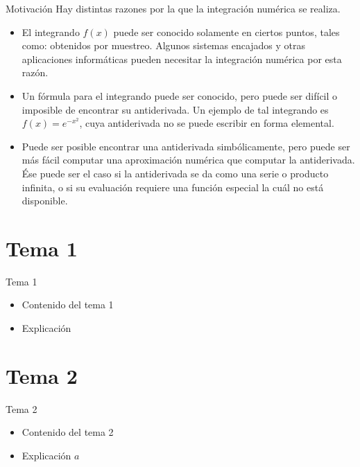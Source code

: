 \documentclass[12pt]{beamer}
\begin{document}
\begin{frame}{Motivaci\'on}
    Hay distintas razones por la que la integraci\'on num\'erica se realiza.
    \begin{itemize}
    \item<2-> El integrando $f(x)$ puede ser conocido solamente en ciertos puntos, tales como: obtenidos por muestreo. Algunos sistemas encajados y otras aplicaciones inform\'aticas pueden necesitar la integraci\'on num\'erica por esta raz\'on.    
    \item<3-> Un f\'ormula para el integrando puede ser conocido, pero puede ser dif\'icil o imposible de encontrar su antiderivada. Un ejemplo de tal integrando es $f(x) = e^{-x^2}$, cuya antiderivada no se puede escribir en forma elemental.    
    \item<4-> Puede ser posible encontrar una antiderivada simb\'olicamente, pero puede ser m\'as f\'acil computar una aproximaci\'on num\'erica que computar la antiderivada. \'Ese puede ser el caso si la antiderivada se da como una serie o producto infinita, o si su evaluaci\'on requiere una funci\'on especial la cu\'al no est\'a disponible.
  \end{itemize}
\end{frame}
    

\section{Tema 1}
\begin{frame}{Tema 1}
    \begin{itemize}
        \item Contenido del tema 1
        \item Explicación
    \end{itemize}
\end{frame}

\section{Tema 2}
\begin{frame}{Tema 2}
    \begin{itemize}
        \item Contenido del tema 2
        \item Explicación $a$
    \end{itemize}
\end{frame}
\end{document}
